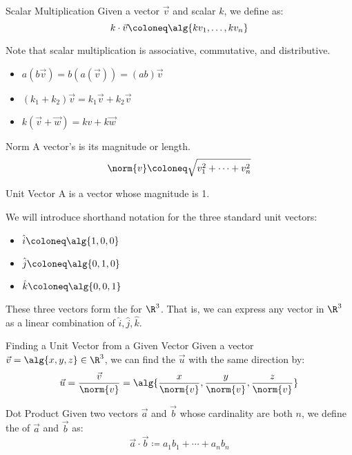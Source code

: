 \documentclass[12pt]{report}
\begin{document}
\begin{dfnbox}{Scalar Multiplication}{}
    Given a vector $\vec{v}$ and scalar $k$, we define  as:
    \[ k \cdot \vec{v} \coloneq \alg{kv_1, \ldots, kv_n} \]
\end{dfnbox}

Note that scalar multiplication is associative, commutative, and distributive.
\begin{itemize}
    \item $a(b\vec{v}) = b(a(\vec{v})) = (ab) \vec{v}$
    \item $(k_1 + k_2) \vec{v} = k_1 \vec{v} + k_2 \vec{v}$
    \item $k (\vec{v} + \vec{w}) = k{v} + k\vec{w}$
\end{itemize}

\begin{dfnbox}{Norm}{}
    A vector's  is its magnitude or length.
    \tcblower
    \[ \norm{v} \coloneq \sqrt{v_1^2 + \cdots + v_n^2} \]
\end{dfnbox}

\begin{dfnbox}{Unit Vector}{}
    A  is a vector whose magnitude is 1.
\end{dfnbox}

We will introduce shorthand notation for the three standard unit vectors:
\begin{itemize}
    \item $\hat{i} \coloneq \alg{1,0,0}$
    \item $\hat{j} \coloneq \alg{0,1,0}$
    \item $\hat{k} \coloneq \alg{0,0,1}$
\end{itemize}
These three vectors form the  for $\R^3$. That is, we can express any vector in $\R^3$ as a linear combination of $\hat{i}, \hat{j}, \hat{k}$.

\begin{tecbox}{Finding a Unit Vector from a Given Vector}{}
    Given a vector $\vec{v} = \alg{x, y, z} \in \R^3$, we can find the  $\vec{u}$ with the same direction by:
    \[ \vec{u} = \frac{\vec{v}}{\norm{v}} = \alg{\frac{x}{\norm{v}}, \frac{y}{\norm{v}}, \frac{z}{\norm{v}}} \]
\end{tecbox}

\begin{dfnbox}{Dot Product}{}
    Given two vectors $\vec{a}$ and $\vec{b}$ whose cardinality are both $n$, we define the  of $\vec{a}$ and $\vec{b}$ as:
    \[ \vec{a} \cdot \vec{b} \coloneq a_1b_1 + \cdots + a_nb_n \]
\end{dfnbox}
\end{document}
